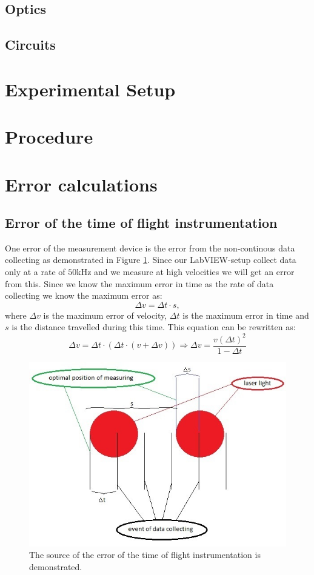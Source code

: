 \documentclass[11pt, a4paper]{article}
\begin{document}
\subsection{Optics}
\subsection{Circuits}

\section{Experimental Setup}
\section{Procedure}

\section{Error calculations}
\subsection{Error of the time of flight instrumentation}
One error of the measurement device is the error from the non-continous data collecting as demonstrated in Figure \ref{f:lasercloseup}.
Since our LabVIEW-setup collect data only at a rate of $50\text{kHz}$ and we measure at high velocities we will get an error from this.
Since we know the maximum error in time as the rate of data collecting we know the maximum error as:
\[
	\Delta v=\Delta t\cdot s,
\]
where $\Delta v$ is the maximum error of velocity, $\Delta t$ is the maximum error in time and $s$ is the distance travelled during this time.
This equation can be rewritten as:
\[
	\Delta v=\Delta t\cdot (\Delta t \cdot (v + \Delta v)) \Rightarrow\Delta v = \frac{v(\Delta t)^2}{1-\Delta t}
\]

\begin{figure}[h]
	\centering
	\includegraphics{errorofdevice}
	\caption{The source of the error of the time of flight instrumentation is demonstrated.}
	\label{f:lasercloseup}
\end{figure}
\end{document}
